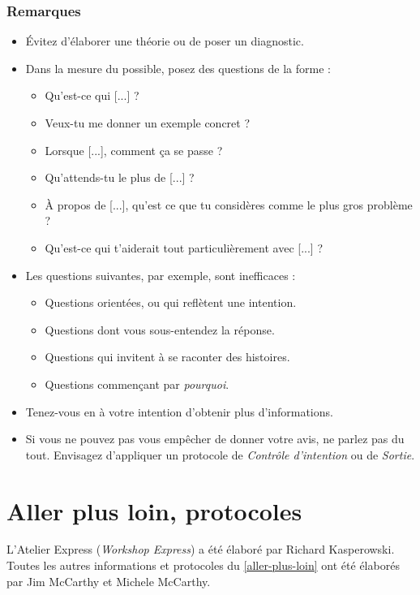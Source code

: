 \documentclass[paper=6in:9in,pagesize=pdftex,headinclude=on,footinclude=on,12pt]{scrbook}
\newcommand*{\numref}[1]{{\hyperref[{#1}]{\autoref*{#1}}}}
\begin{document}
\subsection{Remarques}
\begin{itemize}
	\item Évitez d'élaborer une théorie ou de poser un diagnostic.
	\item Dans la mesure du possible, posez des questions de la forme :
	      \begin{itemize}
	      	\item \og{}Qu'est-ce qui [...] ?\fg{}
	      	\item \og{}Veux-tu me donner un exemple concret ?\fg{}
	      	\item \og{}Lorsque [...], comment ça se passe ?\fg{}
	      	\item \og{}Qu'attends-tu le plus de [...] ?\fg{}
	      	\item \og{}À propos de [...], qu'est ce que tu considères comme le plus gros problème ?\fg{}
	      	\item \og{}Qu'est-ce qui t'aiderait tout particulièrement avec [...] ?\fg{}
	      \end{itemize}
	\item Les questions suivantes, par exemple, sont inefficaces :
		  \begin{itemize}
		    \item Questions orientées, ou qui reflètent une intention.
		    \item Questions dont vous sous-entendez la réponse.
		    \item Questions qui invitent à se raconter des histoires.
		    \item Questions commençant par \emph{pourquoi}.
		  \end{itemize}
	\item Tenez-vous en à votre intention d'obtenir plus d'informations.
	\item Si vous ne pouvez pas vous empêcher de donner votre avis, ne parlez pas du tout. Envisagez d'appliquer un protocole de \emph{Contrôle d'intention}
	      ou de \emph{Sortie}.
\end{itemize}

\chapter{Aller plus loin, protocoles} \label{aller-plus-loin}

L'Atelier Express (\emph{Workshop Express}) a été élaboré par Richard Kasperowski. Toutes les autres informations et protocoles du \numref{aller-plus-loin} ont été
élaborés par Jim McCarthy et Michele McCarthy.
\end{document}
